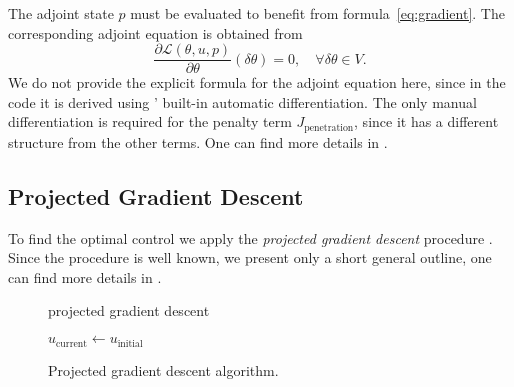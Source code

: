 The adjoint state $p$ must be evaluated to benefit from formula~\eqref{eq:gradient}. The corresponding adjoint equation is obtained from
\begin{equation}
	\frac{\partial \mathcal{L}(\theta,u,p)}{\partial \theta} (\delta \theta)
	= 0, \quad \forall \delta \theta \in V.
\end{equation}
We do not provide the explicit formula for the adjoint equation here, since in the code it is derived using \fenics' built-in automatic differentiation.
The only manual differentiation is required for the penalty term $J_\text{penetration}$, since it has a different structure from the other terms.
One can find more details in \cite[\texttt{optipuls.core}]{optipuls_github}.


\subsection{Projected Gradient Descent}

To find the optimal control we apply the \emph{projected gradient descent} procedure . Since the procedure is well known, we present only a short general outline, one can find more details in \cite[\texttt{optipuls.optimization}]{optipuls_github}.

\begin{figure}
	\begin{algorithm}[H]
	\caption{projected gradient descent}
	\DontPrintSemicolon
	$u_\text{current} \gets u_\text{initial}$\;
	\end{algorithm}
	\caption{Projected gradient descent algorithm.}
\end{figure}




